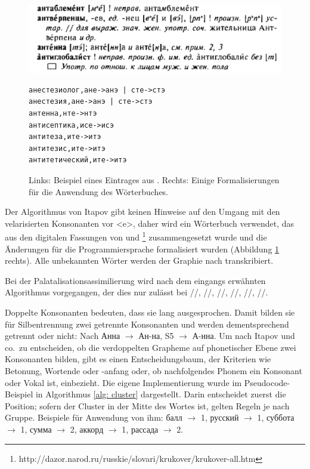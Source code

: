 \documentclass[12pt,headsepline,a4paper]{scrartcl}
\newcommand\textcyr[1]{{\fontencoding{OT2}\fontfamily{wncyr}\selectfont #1}}
\begin{document}
\begin{figure}[htbp]
\begin{minipage}{0.65\textwidth}
\includegraphics[width=\textwidth]{figures/orfo_example}
\end{minipage}
\begin{minipage}{0.3\textwidth}
\begingroup
{}\fontsize{9pt}{12pt}\selectfont
\begin{Verbatim}
анестезиолог,ане->анэ | сте->стэ
анестезия,ане->анэ | сте->стэ
антенна,нте->нтэ
антисептика,исе->исэ
антитеза,ите->итэ
антитезис,ите->итэ
антитетический,ите->итэ
\end{Verbatim}
\endgroup
\end{minipage}
\caption{Links: Beispiel eines Eintrages aus \textcite[33]{rezni2005}. Rechts: Einige Formalisierungen für die Anwendung des Wörterbuches.}
\label{fig: orfo_example}
\end{figure}

Der Algorithmus von Itapov gibt keinen Hinweise auf den Umgang mit den velarisierten Konsonanten vor <e>, daher wird ein Wörterbuch verwendet, das aus den digitalen Fassungen von \textcite{rezni2005} und \textcite{kruk2008}\footnote{http://dazor.narod.ru/russkie/slovari/krukover/krukover-all.htm} zusammengesetzt wurde und die Änderungen für die Programmiersprache formalisiert wurden (Abbildung \ref{fig: orfo_example} rechts). Alle unbekannten Wörter werden der Graphie nach transkribiert. 

Bei der Palatalisationsassimilierung wird nach dem eingangs erwähnten Algorithmus vorgegangen, der dies nur zulässt bei //, //, //, //, //, //.

Doppelte Konsonanten bedeuten, dass sie lang ausgesprochen. Damit bilden sie für Silbentrennung zwei getrennte Konsonanten und werden dementsprechend getrennt oder nicht: Nach \textcite{vino1953} \textcyr{Анна} $\to$ \textcyr{Ан-на}, S5 $\to$ \textcyr{А-нна}. Um nach Itapov und co.\ zu entscheiden, ob die verdoppelten Grapheme auf phonetischer Ebene zwei Konsonanten bilden, gibt es einen Entscheidungsbaum, der Kriterien wie Betonung, Wortende oder -anfang oder, ob nachfolgendes Phonem ein Konsonant oder Vokal ist, einbezieht. Die eigene Implementierung wurde im Pseudocode-Beispiel in Algorithmus \ref{alg: cluster} dargestellt. Darin entscheidet zuerst die Position; sofern der Cluster in der Mitte des Wortes ist, gelten Regeln je nach Gruppe. Beispiele für Anwendung von ihm: \textcyr{балл $\to$ 1, русский $\to$ 1, суббота $\to$ 1, сумма $\to$ 2, аккорд $\to$ 1, рассада $\to$ 2}.
\end{document}
